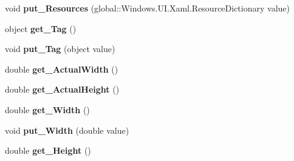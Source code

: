\begin{DoxyCompactItemize}
\mbox{\label{interface_windows_1_1_u_i_1_1_xaml_1_1_i_framework_element_ac37b49cdd76f27a64fdecca76f291b5d}} 
void {\bfseries put\+\_\+\+Resources} (global\+::\+Windows.\+U\+I.\+Xaml.\+Resource\+Dictionary value)
\item 
\mbox{\label{interface_windows_1_1_u_i_1_1_xaml_1_1_i_framework_element_a468d4d76ade5b5e14eccf702af30bbf9}} 
object {\bfseries get\+\_\+\+Tag} ()
\item 
\mbox{\label{interface_windows_1_1_u_i_1_1_xaml_1_1_i_framework_element_a946ec4333d28b5f8c9cca42ce9f9eebc}} 
void {\bfseries put\+\_\+\+Tag} (object value)
\item 
\mbox{\label{interface_windows_1_1_u_i_1_1_xaml_1_1_i_framework_element_a19ecd72cbe177cde31aa3674f563854a}} 
double {\bfseries get\+\_\+\+Actual\+Width} ()
\item 
\mbox{\label{interface_windows_1_1_u_i_1_1_xaml_1_1_i_framework_element_a4501c5030b9e56f51a374091a2fa69f0}} 
double {\bfseries get\+\_\+\+Actual\+Height} ()
\item 
\mbox{\label{interface_windows_1_1_u_i_1_1_xaml_1_1_i_framework_element_a32ae5a6b0dbbc42e55c111d69cf13aa4}} 
double {\bfseries get\+\_\+\+Width} ()
\item 
\mbox{\label{interface_windows_1_1_u_i_1_1_xaml_1_1_i_framework_element_a228ec8feb8d517489e944d64d33ecb60}} 
void {\bfseries put\+\_\+\+Width} (double value)
\item 
\mbox{\label{interface_windows_1_1_u_i_1_1_xaml_1_1_i_framework_element_a23dd911ee7c74e5d1697ba512b6a45d7}} 
double {\bfseries get\+\_\+\+Height} ()
\item 
\mbox{\label{interface_windows_1_1_u_i_1_1_xaml_1_1_i_framework_element_a018855efda632e802d07b8a2be8e6bc5}} 

\end{DoxyCompactItemize}
